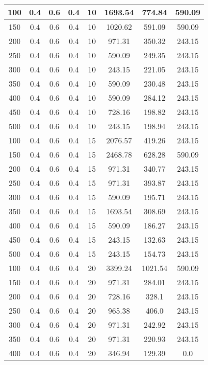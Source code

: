 \documentclass[a4paper, 12pt]{extreport}
\begin{document}
\begin{itemize}
\begin{longtable}{|c|c|c|c|c|c|c|c|}
			100 & 0.4 & 0.6 & 0.4 & 10 & 1693.54 & 774.84 & 590.09 \\\hline
			150 & 0.4 & 0.6 & 0.4 & 10 & 1020.62 & 591.09 & 590.09 \\\hline
			200 & 0.4 & 0.6 & 0.4 & 10 & 971.31 & 350.32 & 243.15 \\\hline
			250 & 0.4 & 0.6 & 0.4 & 10 & 590.09 & 249.35 & 243.15 \\\hline
			300 & 0.4 & 0.6 & 0.4 & 10 & 243.15 & 221.05 & 243.15 \\\hline
			350 & 0.4 & 0.6 & 0.4 & 10 & 590.09 & 230.48 & 243.15 \\\hline
			400 & 0.4 & 0.6 & 0.4 & 10 & 590.09 & 284.12 & 243.15 \\\hline
			450 & 0.4 & 0.6 & 0.4 & 10 & 728.16 & 198.82 & 243.15 \\\hline
			500 & 0.4 & 0.6 & 0.4 & 10 & 243.15 & 198.94 & 243.15 \\\hline
			100 & 0.4 & 0.6 & 0.4 & 15 & 2076.57 & 419.26 & 243.15 \\\hline
			150 & 0.4 & 0.6 & 0.4 & 15 & 2468.78 & 628.28 & 590.09 \\\hline
			200 & 0.4 & 0.6 & 0.4 & 15 & 971.31 & 340.77 & 243.15 \\\hline
			250 & 0.4 & 0.6 & 0.4 & 15 & 971.31 & 393.87 & 243.15 \\\hline
			300 & 0.4 & 0.6 & 0.4 & 15 & 590.09 & 195.71 & 243.15 \\\hline
			350 & 0.4 & 0.6 & 0.4 & 15 & 1693.54 & 308.69 & 243.15 \\\hline
			400 & 0.4 & 0.6 & 0.4 & 15 & 590.09 & 186.27 & 243.15 \\\hline
			450 & 0.4 & 0.6 & 0.4 & 15 & 243.15 & 132.63 & 243.15 \\\hline
			500 & 0.4 & 0.6 & 0.4 & 15 & 243.15 & 154.73 & 243.15 \\\hline
			100 & 0.4 & 0.6 & 0.4 & 20 & 3399.24 & 1021.54 & 590.09 \\\hline
			150 & 0.4 & 0.6 & 0.4 & 20 & 971.31 & 284.01 & 243.15 \\\hline
			200 & 0.4 & 0.6 & 0.4 & 20 & 728.16 & 328.1 & 243.15 \\\hline
			250 & 0.4 & 0.6 & 0.4 & 20 & 965.38 & 406.0 & 243.15 \\\hline
			300 & 0.4 & 0.6 & 0.4 & 20 & 971.31 & 242.92 & 243.15 \\\hline
			350 & 0.4 & 0.6 & 0.4 & 20 & 971.31 & 220.93 & 243.15 \\\hline
			400 & 0.4 & 0.6 & 0.4 & 20 & 346.94 & 129.39 & 0.0 \\\hline

\end{longtable}
\end{itemize}
\end{document}
